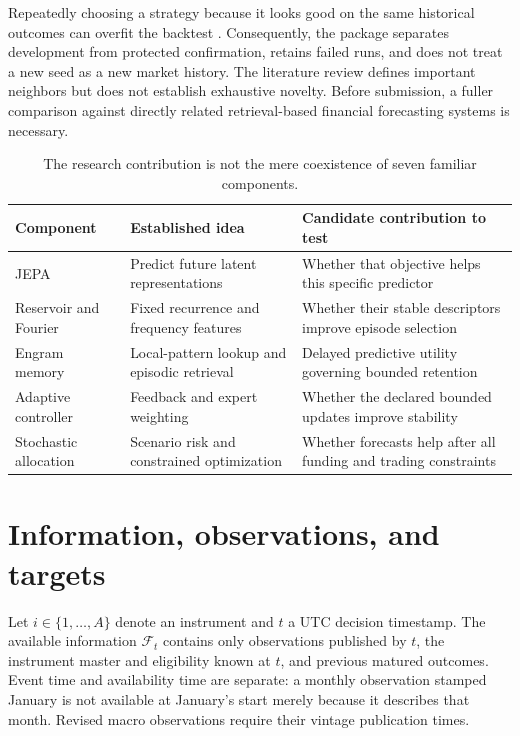 \documentclass[11pt,a4paper]{article}
\newcommand{\F}{\mathcal F}
\begin{document}
Repeatedly choosing a strategy because it looks good on the same historical outcomes can overfit the backtest \citep{bailey2015}. Consequently, the package separates development from protected confirmation, retains failed runs, and does not treat a new seed as a new market history. The literature review defines important neighbors but does not establish exhaustive novelty. Before submission, a fuller comparison against directly related retrieval-based financial forecasting systems is necessary.

\begin{table}[ht]
\centering\small
\begin{tabularx}{\linewidth}{p{.23\linewidth}XX}
\toprule Component & Established idea & Candidate contribution to test \\
\midrule JEPA & Predict future latent representations & Whether that objective helps this specific predictor \\
Reservoir and Fourier & Fixed recurrence and frequency features & Whether their stable descriptors improve episode selection \\
Engram memory & Local-pattern lookup and episodic retrieval & Delayed predictive utility governing bounded retention \\
Adaptive controller & Feedback and expert weighting & Whether the declared bounded updates improve stability \\
Stochastic allocation & Scenario risk and constrained optimization & Whether forecasts help after all funding and trading constraints \\
\bottomrule
\end{tabularx}
\caption{The research contribution is not the mere coexistence of seven familiar components.}
\end{table}

\section{Information, observations, and targets}

Let $i\in\{1,\ldots,A\}$ denote an instrument and $t$ a UTC decision timestamp. The available information $\F_t$ contains only observations published by $t$, the instrument master and eligibility known at $t$, and previous matured outcomes. Event time and availability time are separate: a monthly observation stamped January is not available at January's start merely because it describes that month. Revised macro observations require their vintage publication times.
\end{document}
